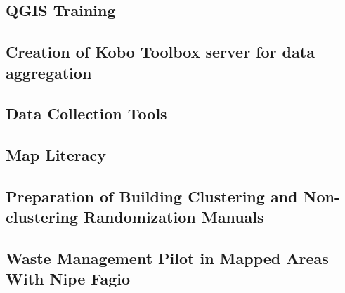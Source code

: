 \documentclass[a4paper,12pt,twoside]{article}
\begin{document}
\subsection{QGIS Training}

    \begin{multicols}{2}
    \lipsum[0-5]
    \end{multicols}

\subsection{Creation of Kobo Toolbox  server for data aggregation}

    \begin{multicols}{2}
    \lipsum[0-5]
    \end{multicols}
	
\subsection{Data Collection Tools}

    \begin{multicols}{2}
    \lipsum[0-5]
    \end{multicols}

\subsection{Map Literacy}

    \begin{multicols}{2}
    \lipsum[0-5]
    \end{multicols}

\subsection{Preparation of Building Clustering and Non-clustering Randomization Manuals}

    \begin{multicols}{2}
    \lipsum[0-5]
    \end{multicols}

\subsection{Waste Management Pilot in Mapped Areas With Nipe Fagio}

    \begin{multicols}{2}
    \lipsum[0-5]
    \end{multicols}
\end{document}

